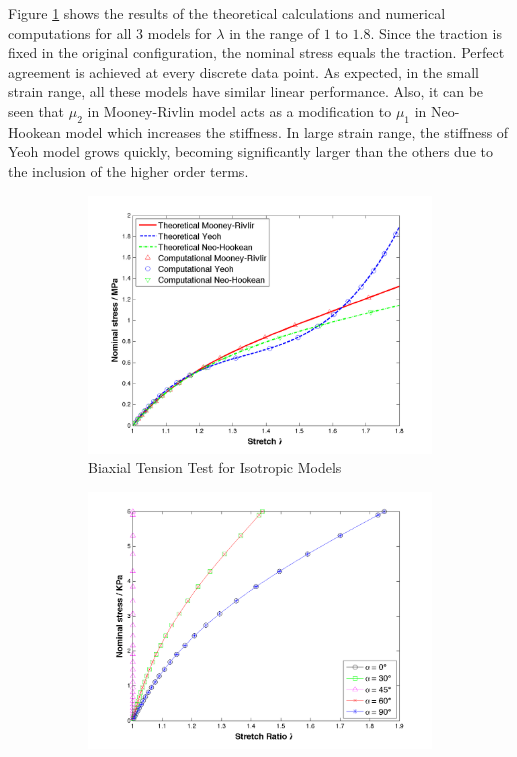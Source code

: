 Figure \ref{fig:biaxial1} shows the results of the theoretical calculations and numerical computations for all $3$ models for $\lambda$ in the range of $1$ to $1.8$. Since the traction is fixed in the original configuration, the nominal stress equals the traction. Perfect agreement is achieved at every discrete data point. As expected, in the small strain range, all these models have similar linear performance. Also, it can be seen that $\mu_2$ in Mooney-Rivlin model acts as a modification to $\mu_1$ in Neo-Hookean model which increases the stiffness. In large strain range, the stiffness of Yeoh model grows quickly, becoming significantly larger than the others due to the inclusion of the higher order terms.


\begin{figure}[H]
	\centering
	\begin{subfigure}[b]{0.45\textwidth}
		\centering
		\includegraphics[width=\textwidth]{./figures/biaxial1.png}
		\caption{Biaxial Tension Test for Isotropic Models}
		\label{fig:biaxial1}
	\end{subfigure}
	\begin{subfigure}[b]{0.45\textwidth}
		\centering
		\includegraphics[width=\textwidth]{./figures/biaxial2.png}

\end{subfigure}
\end{figure}

